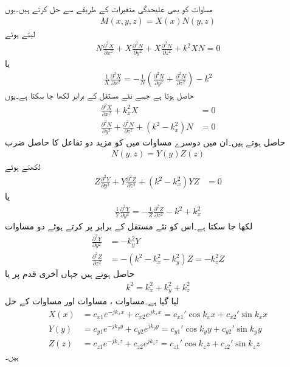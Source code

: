 مساوات  کو بھی علیحدگی متغیرات کے طریقے سے حل کرتے ہیں۔یوں
\begin{align}\label{مساوات_مویج_مستطیلی_گھمکی_علیحدگی_الف}
M(x,y,z)=X(x)N(y,z)
\end{align}
لیتے ہوئے
\begin{align*}
N\frac{\partial^2 X}{\partial x^2}+X\frac{\partial^2 N}{\partial y^2}+X\frac{\partial^2 N}{\partial z^2}+k^2 XN=0
\end{align*}
یا
\begin{align*}
\frac{1}{X}\frac{\partial^2 X}{\partial x^2}=-\frac{1}{N}\left(\frac{\partial^2 N}{\partial y^2}+\frac{\partial^2 N}{\partial z^2}\right)-k^2 
\end{align*}
حاصل ہوتا ہے جسے نئے مستقل  کے برابر لکھا جا سکتا ہے۔یوں 
\begin{align}
\frac{\partial^2 X}{\partial x^2}+k_x^2 X&=0 \label{مساوات_مویج_میکس_ویل_عمومی_الف}\\
\frac{\partial^2 N}{\partial y^2}+\frac{\partial^2 N}{\partial z^2}+(k^2 -k_x^2)N &=0
\end{align}
حاصل ہوتے ہیں۔ان میں دوسرے مساوات میں  کو مزید دو تفاعل کا حاصل ضرب
\begin{align}\label{مساوات_مویج_مستطیلی_گھمکی_علیحدگی_ب}
N(y,z)=Y(y)Z(z)
\end{align}
 لکھتے ہوئے
\begin{align*}
Z\frac{\partial^2 Y}{\partial y^2}+Y\frac{\partial^2 Z}{\partial z^2}+(k^2 -k_x^2)YZ &=0
\end{align*}
یا
\begin{align*}
\frac{1}{Y}\frac{\partial^2 Y}{\partial y^2}=-\frac{1}{Z}\frac{\partial^2 Z}{\partial z^2}-k^2 +k_x^2
\end{align*}
لکھا جا سکتا ہے۔اس کو نئے مستقل  کے برابر  پر کرتے ہوئے دو مساوات
\begin{align}
\frac{\partial^2 Y}{\partial y^2}&=-k_y^2 Y \label{مساوات_مویج_میکس_ویل_عمومی_ب}\\
\frac{\partial^2 Z}{\partial z^2}&=-(k^2 -k_x^2-k_y^2)Z=-k_z^2 Z \label{مساوات_مویج_میکس_ویل_عمومی_پ}
\end{align}
حاصل ہوتے ہیں جہاں آخری قدم پر  یا
\begin{align}\label{مساوات_مویج_مستطیلی_گھمکی_علیحدگی_پ}
k^2 =k_x^2+k_y^2+k_z^2
\end{align}
لیا گیا ہے۔مساوات ، مساوات  اور مساوات  کے حل
\begin{align}
X(x)&=c_{x1}e^{- j k_x x}+c_{x2}e^{ j k_x x}  = c_{x1}' \cos {k_x x}+c_{x2}' \sin {k_x x}\label{مساوات_مویج_گھمکی_عمومی_الف}\\
Y(y)&=c_{y1} e^{- j k_y y}+c_{y2} e^{ j k_y y}=c_{y1}' \cos{ k_y y}+c_{y2}' \sin{ k_y y}   \label{مساوات_مویج_گھمکی_عمومی_ب}\\
Z(z)&=c_{z1} e^{- j k_z z}+c_{z2} e^{j k_z z} =c_{z1}' \cos{  k_z z}+c_{z2}' \sin{ k_z z}  \label{مساوات_مویج_گھمکی_عمومی_پ}
\end{align}
ہیں۔

